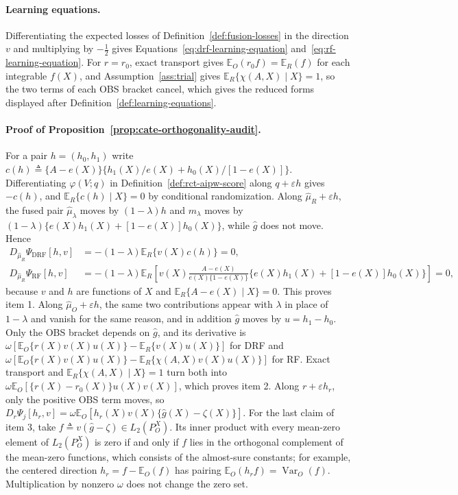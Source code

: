 \paragraph{Learning equations.}
Differentiating the expected losses of Definition~\ref{def:fusion-losses} in the direction $v$ and multiplying by $-\tfrac12$ gives Equations~\eqref{eq:drf-learning-equation} and~\eqref{eq:rf-learning-equation}. For $r=r_0$, exact transport gives $\mathbb E_O(r_0f)=\mathbb E_R(f)$ for each integrable $f(X)$, and Assumption~\ref{ass:trial} gives $\mathbb E_R\{\chi(A,X)\mid X\}=1$, so the two terms of each OBS bracket cancel, which gives the reduced forms displayed after Definition~\ref{def:learning-equations}.

\paragraph{Proof of Proposition~\ref{prop:cate-orthogonality-audit}.}
For a pair $h=(h_0,h_1)$ write $c(h)\triangleq\{A-e(X)\}\{h_1(X)/e(X)+h_0(X)/[1-e(X)]\}$. Differentiating $\varphi(V;q)$ in Definition~\ref{def:rct-aipw-score} along $q+\varepsilon h$ gives $-c(h)$, and $\mathbb E_R\{c(h)\mid X\}=0$ by conditional randomization. Along $\widehat\mu_R+\varepsilon h$, the fused pair $\widehat\mu_\lambda$ moves by $(1-\lambda)h$ and $m_\lambda$ moves by $(1-\lambda)\{e(X)h_1(X)+[1-e(X)]h_0(X)\}$, while $\widehat g$ does not move. Hence
\begin{align*}
D_{\widehat\mu_R}\Psi_{\mathrm{DRF}}[h,v]&=-(1-\lambda)\mathbb E_R\{v(X)c(h)\}=0,
\\
D_{\widehat\mu_R}\Psi_{\mathrm{RF}}[h,v]&=-(1-\lambda)\mathbb E_R\left[v(X)\frac{A-e(X)}{e(X)\{1-e(X)\}}\{e(X)h_1(X)+[1-e(X)]h_0(X)\}\right]=0,
\end{align*}
because $v$ and $h$ are functions of $X$ and $\mathbb E_R\{A-e(X)\mid X\}=0$. This proves item 1. Along $\widehat\mu_O+\varepsilon h$, the same two contributions appear with $\lambda$ in place of $1-\lambda$ and vanish for the same reason, and in addition $\widehat g$ moves by $u=h_1-h_0$. Only the OBS bracket depends on $\widehat g$, and its derivative is $\omega[\mathbb E_O\{r(X)v(X)u(X)\}-\mathbb E_R\{v(X)u(X)\}]$ for DRF and $\omega[\mathbb E_O\{r(X)v(X)u(X)\}-\mathbb E_R\{\chi(A,X)v(X)u(X)\}]$ for RF. Exact transport and $\mathbb E_R\{\chi(A,X)\mid X\}=1$ turn both into $\omega\mathbb E_O[\{r(X)-r_0(X)\}u(X)v(X)]$, which proves item 2. Along $r+\varepsilon h_r$, only the positive OBS term moves, so $D_r\Psi_j[h_r,v]=\omega\mathbb E_O[h_r(X)v(X)\{\widehat g(X)-\zeta(X)\}]$. For the last claim of item 3, take $f\triangleq v(\widehat g-\zeta)\in L_2(P_O^X)$. Its inner product with every mean-zero element of $L_2(P_O^X)$ is zero if and only if $f$ lies in the orthogonal complement of the mean-zero functions, which consists of the almost-sure constants; for example, the centered direction $h_r=f-\mathbb E_O(f)$ has pairing $\mathbb E_O(h_rf)=\operatorname{Var}_O(f)$. Multiplication by nonzero $\omega$ does not change the zero set.


